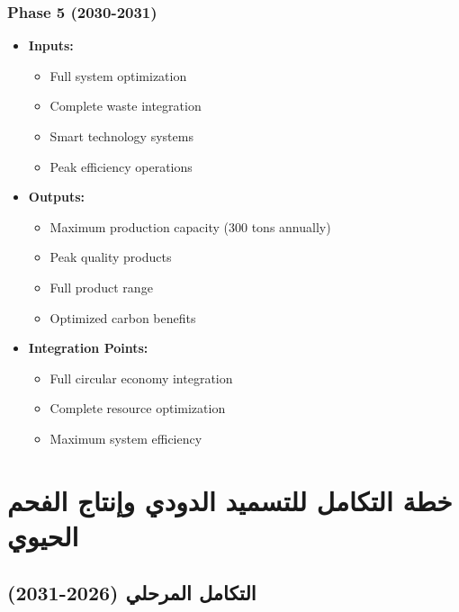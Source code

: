 \subsubsection{Phase 5 (2030-2031)}
\begin{itemize}
    \item \textbf{Inputs:}
    \begin{itemize}
        \item Full system optimization
        \item Complete waste integration
        \item Smart technology systems
        \item Peak efficiency operations
    \end{itemize}
    \item \textbf{Outputs:}
    \begin{itemize}
        \item Maximum production capacity (300 tons annually)
        \item Peak quality products
        \item Full product range
        \item Optimized carbon benefits
    \end{itemize}
    \item \textbf{Integration Points:}
    \begin{itemize}
        \item Full circular economy integration
        \item Complete resource optimization
        \item Maximum system efficiency
    \end{itemize}
\end{itemize}

\section{خطة التكامل للتسميد الدودي وإنتاج الفحم الحيوي}

\subsection{التكامل المرحلي (2026-2031)}

